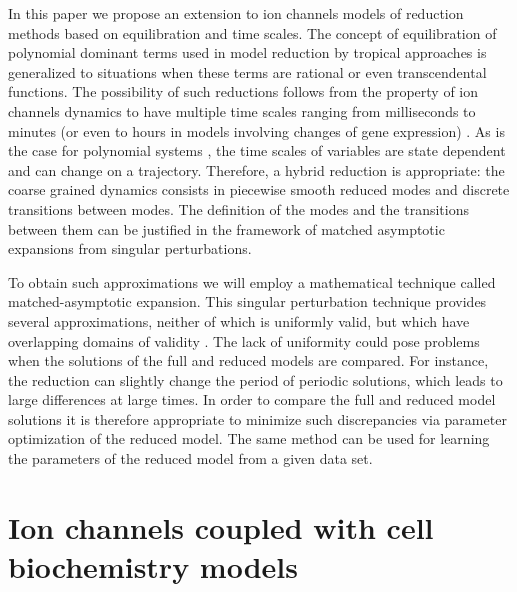 \documentclass{llncs}
\begin{document}
In this paper we propose an extension to ion channels models of reduction methods based on equilibration and
time scales. The concept of equilibration of polynomial dominant terms
used in model reduction by tropical approaches is generalized to situations when
these terms are rational or even transcendental functions. The possibility of
such reductions follows from the property of  ion channels dynamics
to have multiple time scales ranging from milliseconds to minutes (or even to hours in models involving changes of gene expression) \cite{keener1998mathematical}. As is the case for polynomial systems \cite{radulescu2015symbolic},
the time scales of variables are state dependent and can change on a trajectory.
Therefore, a hybrid reduction is appropriate: the coarse
grained dynamics consists in piecewise smooth reduced modes and discrete
transitions between modes. The definition of the
modes and the transitions between them can be justified in the framework of matched
asymptotic expansions from singular perturbations.

 {To obtain such approximations we will employ a mathematical technique called
matched-asymptotic expansion. This singular perturbation technique provides
several approximations, neither of which is uniformly valid, but which have
overlapping domains of validity \cite{lagerstrom1972basic,holmes2012introduction}.
The lack of uniformity could pose problems when the solutions of the full and
reduced models are compared. For instance, the reduction can slightly change the period of
periodic solutions, which leads to large differences at large times.
In order to compare the full and reduced model solutions it is therefore
appropriate to minimize such discrepancies via parameter optimization of the reduced
model. The same method can be used for learning the parameters of the reduced model
from a given data set. }

%










\section{Ion channels coupled with cell biochemistry models}
\end{document}
